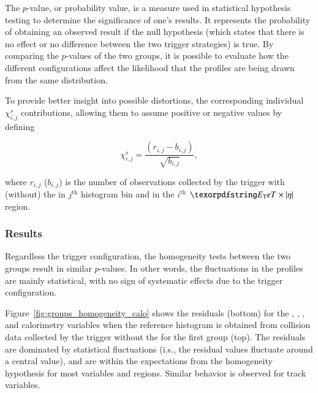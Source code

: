 The $p$-value, or probability value, is a measure used in statistical hypothesis testing to determine the significance of one's results. It represents the probability of obtaining an observed result if the null hypothesis (which states that there is no effect or no difference between the two trigger strategies) is true. By comparing the $p$-values of the two groups, it is possible to evaluate how the different configurations affect the likelihood that the profiles are being drawn from the same distribution. 


To provide better insight into possible distortions, the corresponding 
individual $\chi_{i,j}^{s}$ contributions, allowing them to assume positive or negative values by defining

\begin{equation}
  \chi_{i,j}^{s} = \frac{(r_{i,j} - b_{i,j})}{\sqrt{b_{i,j}}},
  \label{eq:signed_chi}
\end{equation}

\noindent where $r_{i,j}$ ($b_{i,j}$) is the number of observations collected by the trigger with (without) the \rnn{} in $j^\text{th}$ histogram bin and in the $i^\text{th}$ $\et{}\times\abseta{}$ region.


\subsubsection{Results}\label{top:agreement_homogeneity_results}




Regardless the trigger configuration, the homogeneity tests between the two groups result in similar $p$-values. In other words, the fluctuations in the profiles are mainly statistical, with no sign of systematic effects due to the trigger configuration. 

Figure~\ref{fig:groups_homogeneity_calo} shows the residuals (bottom) for the \reta, \rphi, \eratio, and \rhad  calorimetry variables when the reference histogram is obtained from collision data collected by the trigger without the \rnn{} for the first group (top). The residuals are dominated by statistical fluctuations (i.s., the residual values fluctuate around a central value), and are within the expectations from the homogeneity hypothesis for most variables and regions. Similar behavior is observed for track variables. 

